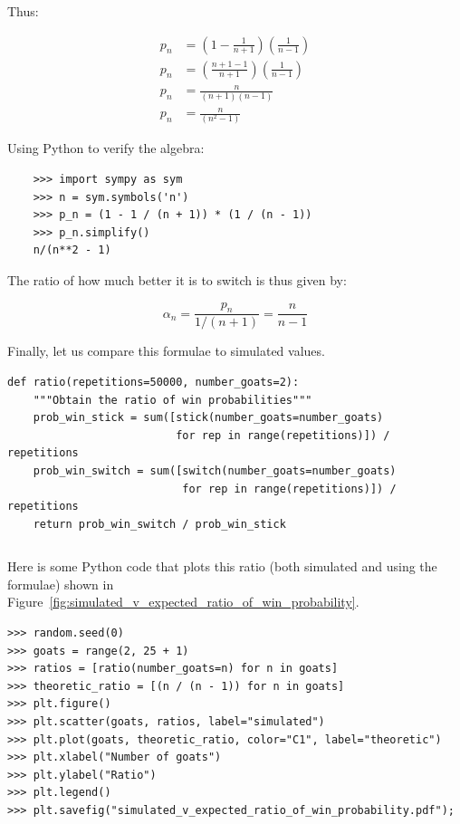 \documentclass[a4paper]{article}
\begin{document}
Thus:

\begin{multicols}{2}

    \begin{align}
        p_n &= \left(1 - \frac{1}{n + 1}\right)\left(\frac{1}{n - 1}\right)\\
        p_n &= \left(\frac{n + 1 - 1}{n + 1}\right)\left(\frac{1}{n - 1}\right)\\
        p_n &= \frac{n}{(n + 1)(n - 1)}\\
        p_n &= \frac{n}{(n^2 - 1)}
    \end{align}

    \columnbreak

Using Python to verify the algebra:

    \begin{verbatim}
    >>> import sympy as sym
    >>> n = sym.symbols('n')
    >>> p_n = (1 - 1 / (n + 1)) * (1 / (n - 1))
    >>> p_n.simplify()
    n/(n**2 - 1)
    \end{verbatim}

\end{multicols}

The ratio of how much better it is to switch is thus given by:

\[
    \alpha_n = \frac{p_n}{1 / (n + 1)} = \frac{n}{n - 1}
\]


Finally, let us compare this formulae to simulated values.

\begin{verbatim}
def ratio(repetitions=50000, number_goats=2):
    """Obtain the ratio of win probabilities"""
    prob_win_stick = sum([stick(number_goats=number_goats) 
                          for rep in range(repetitions)]) / repetitions
    prob_win_switch = sum([switch(number_goats=number_goats) 
                           for rep in range(repetitions)]) / repetitions
    return prob_win_switch / prob_win_stick
\end{verbatim}

\begin{verbatim}
\end{verbatim}

Here is some Python code that plots this ratio (both simulated and using the
formulae) shown in
Figure~\ref{fig:simulated_v_expected_ratio_of_win_probability}.

\begin{verbatim}
>>> random.seed(0)
>>> goats = range(2, 25 + 1)
>>> ratios = [ratio(number_goats=n) for n in goats]
>>> theoretic_ratio = [(n / (n - 1)) for n in goats]
>>> plt.figure()
>>> plt.scatter(goats, ratios, label="simulated")
>>> plt.plot(goats, theoretic_ratio, color="C1", label="theoretic")
>>> plt.xlabel("Number of goats")
>>> plt.ylabel("Ratio")
>>> plt.legend()
>>> plt.savefig("simulated_v_expected_ratio_of_win_probability.pdf");
\end{verbatim}
\end{document}
